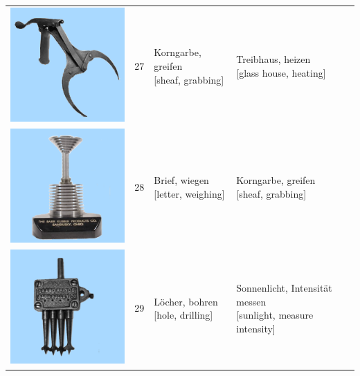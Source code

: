 \documentclass[
  english,
  doc,12pt,twoside,floatsintext]{apa7}
\begin{document}
\begin{center}
\begin{ThreePartTable}
{\begin{longtable}{llll}
\includegraphics[valign=c, scale=0.23]{../materials/unfamiliar/27.png} & 27 & \makecell[l]{Korngarbe, greifen\\{[sheaf, grabbing]}} & \makecell[l]{Treibhaus, heizen\\{[glass house, heating]}}\\
\includegraphics[valign=c, scale=0.23]{../materials/unfamiliar/28.png} & 28 & \makecell[l]{Brief, wiegen\\{[letter, weighing]}} & \makecell[l]{Korngarbe, greifen\\{[sheaf, grabbing]}}\\
\includegraphics[valign=c, scale=0.23]{../materials/unfamiliar/29.png} & 29 & \makecell[l]{Löcher, bohren\\{[hole, drilling]}} & \makecell[l]{Sonnenlicht, Intensität messen\\{[sunlight, measure intensity]}}\\

\end{longtable}}
\end{ThreePartTable}
\end{center}
\end{document}
